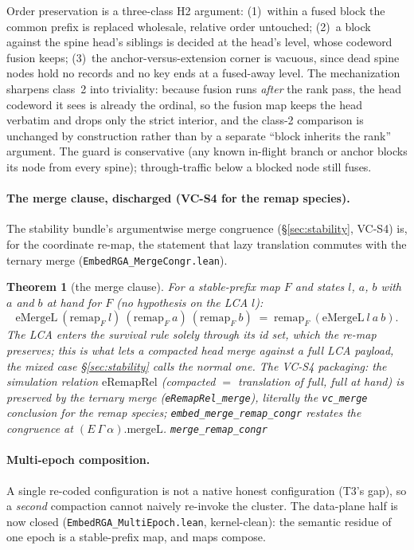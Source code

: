 \documentclass[11pt]{article}
\newtheorem{theorem}{Theorem}[section]
\newcommand{\lean}[1]{\texttt{#1}}
\newcommand{\code}[1]{\texttt{#1}}
\begin{document}
\noindent Order preservation is a three-class H2 argument:
(1)~within a fused block the common prefix is replaced wholesale,
relative order untouched; (2)~a block against the spine head's siblings
is decided at the head's level, whose codeword fusion keeps; (3)~the
anchor-versus-extension corner is vacuous, since dead spine nodes hold no
records and no key ends at a fused-away level. The mechanization sharpens
class~2 into triviality: because fusion runs \emph{after} the rank pass,
the head codeword it sees is already the ordinal, so the fusion map keeps
the head verbatim and drops only the strict interior, and the class-2
comparison is unchanged by construction rather than by a separate
``block inherits the rank'' argument. The guard is conservative (any
known in-flight branch or anchor blocks its node from every spine);
through-traffic below a blocked node still fuses.

\paragraph{The merge clause, discharged (VC-S4 for the remap species).}
The stability bundle's argumentwise merge congruence
(\S\ref{sec:stability}, VC-S4) is, for the coordinate re-map, the
statement that lazy translation commutes with the ternary merge
(\code{EmbedRGA\_MergeCongr.lean}).

\begin{theorem}[the merge clause]
\label{thm:mergeremap}
For a stable-prefix map $F$ and states $l$, $a$, $b$ with $a$ and $b$
at hand for $F$ (\emph{no} hypothesis on the LCA $l$):
\[
  \mathrm{eMergeL}\ (\mathrm{remap}_F\ l)\ (\mathrm{remap}_F\ a)\
  (\mathrm{remap}_F\ b) \;=\; \mathrm{remap}_F\ (\mathrm{eMergeL}\ l\
  a\ b).
\]
The LCA enters the survival rule solely through its id set, which the
re-map preserves; this is what lets a compacted head merge against a
full LCA payload, the mixed case \S\ref{sec:stability} calls the
normal one. The VC-S4 packaging: the simulation relation
$\mathrm{eRemapRel}$ (compacted $=$ translation of full, full at hand)
is preserved by the ternary merge (\lean{eRemapRel\_merge}), literally
the \code{vc\_merge} conclusion for the remap species;
\lean{embed\_merge\_remap\_congr} restates the congruence at
$(E\ \Gamma\ \alpha).\mathrm{mergeL}$.
\hfill\lean{merge\_remap\_congr}
\end{theorem}

\paragraph{Multi-epoch composition.} A single re-coded configuration is
not a native honest configuration (T3's gap), so a \emph{second}
compaction cannot naively re-invoke the cluster. The data-plane half is
now closed (\code{EmbedRGA\_MultiEpoch.lean}, kernel-clean): the
semantic residue of one epoch is a stable-prefix map, and maps compose.
\end{document}
